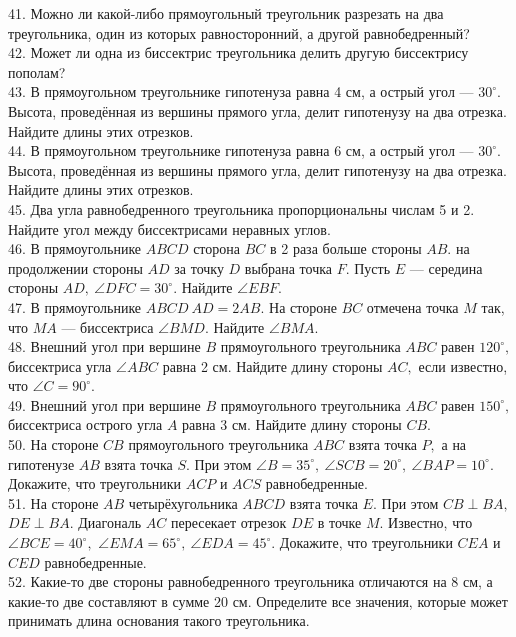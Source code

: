 41. Можно ли какой-либо прямоугольный треугольник разрезать на два треугольника, один из которых равносторонний, а другой равнобедренный?\\
42. Может ли одна из биссектрис треугольника делить другую биссектрису пополам?\\
43. В прямоугольном треугольнике гипотенуза равна 4 см, а острый угол --- $30^\circ.$ Высота, проведённая из вершины прямого угла, делит гипотенузу на два отрезка. Найдите длины этих отрезков.\\
44. В прямоугольном треугольнике гипотенуза равна 6 см, а острый угол --- $30^\circ.$ Высота, проведённая из вершины прямого угла, делит гипотенузу на два отрезка. Найдите длины этих отрезков.\\
45. Два угла равнобедренного треугольника пропорциональны числам 5 и 2. Найдите угол между биссектрисами неравных углов.\\
46. В прямоугольнике $ABCD$ сторона $BC$ в 2 раза больше стороны $AB.$ на продолжении стороны $AD$ за точку $D$ выбрана точка $F.$ Пусть $E$ --- середина стороны $AD,\ \angle DFC=30^\circ.$ Найдите $\angle EBF.$\\
47. В прямоугольнике $ABCD\ AD=2AB.$ На стороне $BC$ отмечена точка $M$ так, что $MA$ --- биссектриса $\angle BMD.$ Найдите $\angle BMA.$\\
48. Внешний угол при вершине $B$ прямоугольного треугольника $ABC$ равен $120^\circ,$ биссектриса угла $\angle ABC$ равна 2 см. Найдите длину стороны $AC,$ если известно, что $\angle C=90^\circ.$\\
49. Внешний угол при вершине $B$ прямоугольного треугольника $ABC$ равен $150^\circ,$ биссектриса острого угла $A$ равна 3 см. Найдите длину стороны $CB.$\\
50. На стороне $CB$ прямоугольного треугольника $ABC$ взята точка $P,$ а на гипотенузе $AB$ взята точка $S.$ При этом $\angle B=35^\circ,\ \angle SCB=20^\circ,\ \angle BAP=10^\circ.$ Докажите, что треугольники $ACP$ и $ACS$ равнобедренные.\\
51. На стороне $AB$ четырёхугольника $ABCD$ взята точка $E.$ При этом $CB\perp BA,$ $DE\perp BA.$ Диагональ $AC$ пересекает отрезок $DE$ в точке $M.$ Известно, что
$\angle BCE=40^\circ,$ $\angle EMA=65^\circ,\ \angle EDA=45^\circ.$ Докажите, что треугольники $CEA$ и $CED$ равнобедренные.\\
52. Какие-то две стороны равнобедренного треугольника отличаются на 8 см, а какие-то две составляют в сумме 20 см. Определите все значения, которые может принимать длина основания такого треугольника.\\

